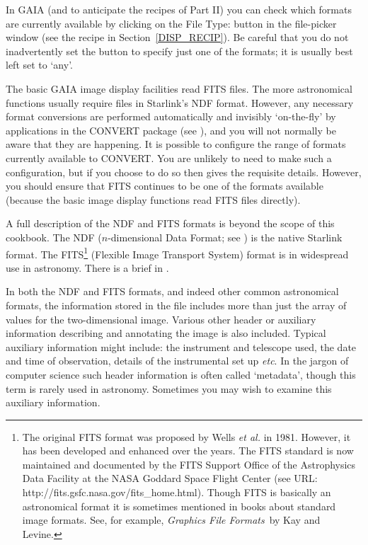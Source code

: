 \documentclass[twoside,11pt]{starlink}
\begin{document}
In GAIA (and to anticipate the recipes of Part II) you can check which
formats are currently available by clicking on the \textsf{File Type:} button
in the file-picker window (see the recipe in Section~\ref{DISP_RECIP}).
Be careful that you do not inadvertently set the button to specify just one
of the formats; it is usually best left set to `\textsf{any}'.

The basic GAIA image display facilities read FITS files.  The more
astronomical functions usually require files in Starlink's NDF format.
However, any necessary format conversions are performed automatically and
invisibly `on-the-fly' by applications in the CONVERT package (see
\cite{SUN55}), and you will not normally be aware
that they are happening.  It is possible to configure the range of formats
currently available to CONVERT.  You are unlikely to need to make such a
configuration, but if you choose to do so then
\cite{SSN20} gives the requisite details.  However,
you should ensure that FITS continues to be one of the formats available
(because the basic image display functions read FITS files directly).

A full description of the NDF and FITS formats is beyond the scope of this
cookbook.  The NDF ($n$-dimensional Data Format; see
\cite{SUN33}) is the native Starlink format.
The FITS\footnote{The original FITS format was proposed by Wells \textit{et
al.}\/\cite{WELLS81} in 1981.  However, it has been developed and enhanced
over the years.  The FITS standard is now maintained and documented by the
FITS Support Office of the Astrophysics Data Facility at the NASA Goddard
Space Flight Center (see URL:
{http://fits.gsfc.nasa.gov/fits_home.html}).
Though FITS is basically an astronomical format it is sometimes mentioned
in books about standard image formats.  See, for example, \textit{Graphics
File Formats}\, by Kay and Levine\cite{KAY95}.} (Flexible Image Transport
System) format is in widespread use in astronomy.  There is a brief
 in
\cite{SC5}.

In both the NDF and FITS formats, and indeed other common astronomical
formats, the information stored in the file includes more than just the
array of values for the two-dimensional image.  Various other header or
auxiliary information describing and annotating the image is also included.
Typical auxiliary information might include: the instrument and telescope
used, the date and time of observation, details of the instrumental set up
\emph{etc}.  In the jargon of computer science such header information is
often called `metadata', though this term is rarely used in astronomy.
Sometimes you may wish to examine this auxiliary information.
\end{document}
